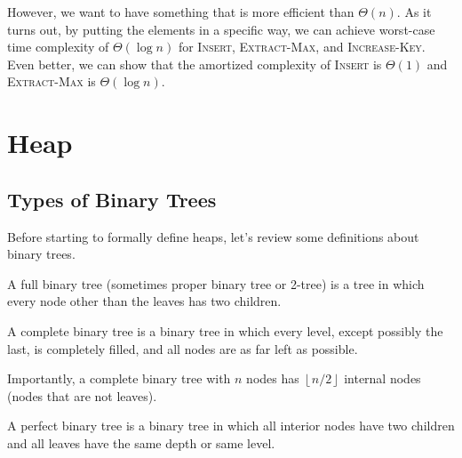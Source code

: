 However, we want to have something that is more efficient than $\Theta(n)$. As it turns out, by putting the elements in a specific way, we can achieve worst-case time complexity of $\Theta(\log n)$ for \textsc{Insert}, \textsc{Extract-Max}, and \textsc{Increase-Key}. Even better, we can show that the amortized complexity of \textsc{Insert} is $\Theta(1)$ and \textsc{Extract-Max} is $\Theta(\log n)$.

\section{Heap} 

\subsection{Types of Binary Trees}

Before starting to formally define heaps, let's review some definitions about binary trees. 

\begin{definition} 
    A full binary tree (sometimes proper binary tree or 2-tree) is a tree in which every node other than the leaves has two children. 
\end{definition}

\begin{definition} 
    A complete binary tree is a binary tree in which every level, except possibly the last, is completely filled, and all nodes are as far left as possible.

    Importantly, a complete binary tree with $n$ nodes has $\left\lfloor n / 2 \right\rfloor$ internal nodes (nodes that are not leaves).
\end{definition}

\begin{definition} 
    A perfect binary tree is a binary tree in which all interior nodes have two children and all leaves have the same depth or same level.
\end{definition}

